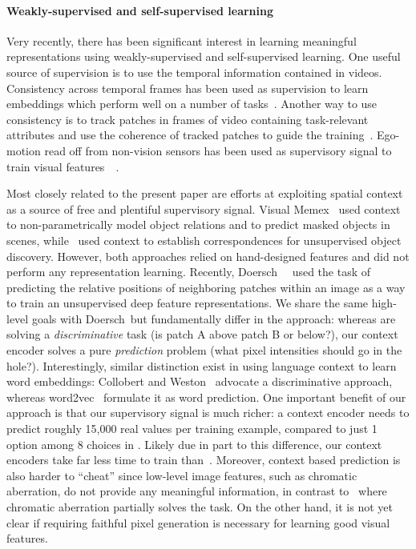 \documentclass[10pt,twocolumn,letterpaper]{article}
\begin{document}
%
%
%
%
%
%
%
%
%
%
%
%
%
%
%

\paragraph{Weakly-supervised and self-supervised learning}
Very recently, there has been significant interest in learning meaningful representations using weakly-supervised and self-supervised learning.
One useful source of supervision is to use the temporal information contained in videos.
Consistency across temporal frames has been used as supervision to learn embeddings which perform well on a number of tasks~\cite{goroshin2015unsupervised,ramanathan2015learning}.
Another way to use consistency is to track patches in frames of video containing task-relevant attributes and use the coherence of tracked patches to guide the training~\cite{wang2015unsupervised}.
%
%
Ego-motion read off from non-vision sensors has been used as supervisory signal to train visual features~\etal~\cite{agrawal2015learning,jayaraman2015learning}.
%
%
%

Most closely related to the present paper are efforts at exploiting spatial context as a source of free and plentiful supervisory signal.
%
Visual Memex~\cite{malisiewicz2009beyond} used context to non-parametrically model object relations and to predict masked objects in scenes, while~\cite{doersch2014context} used context to establish correspondences for unsupervised object discovery.
However, both approaches relied on hand-designed features and did not perform any representation learning.
%
%
Recently, Doersch~\etal~\cite{doersch2015unsupervised} used the task of predicting the relative positions of neighboring patches within an image as a way to train an unsupervised deep feature representations.  We share the same high-level goals with Doersch~\etal but fundamentally differ in the approach: whereas \cite{doersch2015unsupervised} are solving a \textit{discriminative} task (is patch A above patch B or below?), our context encoder solves a pure \textit{prediction} problem (what pixel intensities should go in the hole?).  Interestingly, similar distinction exist in using language context to learn word embeddings: Collobert and Weston~\cite{collobert2008unified} advocate a discriminative approach, whereas word2vec~\cite{mikolov2013distributed} formulate it as word prediction.
%
One important benefit of our approach is that our supervisory signal is much richer: a context encoder needs to predict roughly 15,000 real values per training example, compared to just 1 option among 8 choices in \cite{doersch2015unsupervised}.
Likely due in part to this difference, our context encoders take far less time to train than~\cite{doersch2015unsupervised}.
Moreover, context based prediction is also harder to ``cheat'' since low-level image features, such as chromatic aberration, do not provide any meaningful information, in contrast to~\cite{doersch2015unsupervised} where chromatic aberration partially solves the task.  On the other hand, it is not yet clear if requiring faithful pixel generation is necessary for learning good visual features.
\end{document}
